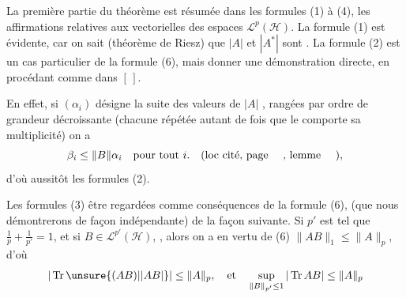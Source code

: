 La première partie du théorème est résumée dans les
formules (1) à (4),   les affirmations relatives
aux  vectorielles des espaces $\mathcal L^p(\mathcal H)$.
La formule (1) est évidente, car 
  on sait (théorème
de Riesz) que $|A|$ et $|A^*|$ sont  
 . La formule (2) est un cas
particulier de la formule (6), mais  
donner une démonstration 
directe, en procédant comme dans $[\,]$.

En effet, si $(\alpha_i)$  désigne la
suite des valeurs  de  $|A|$
 ,
rangées par ordre de grandeur
décroissante (chacune répétée autant de fois
que le comporte sa multiplicité) on a
\[
\beta_i\leq\|B\|\alpha_i\quad\text{pour tout }i.\quad(\text{loc cité, page \quad, lemme \quad}),
\]
d'où aussitôt les formules (2).

Les formules (3)   être regardées  comme
conséquences de la formule (6), (que nous démontrerons de façon indépendante) de la façon
suivante. Si $p'$ est tel que $\frac{1}{p}+\frac{1}{p'}=1$,
et si $B\in\mathcal L^{p'}(\mathcal H)$, 
, alors
on a en vertu de (6) $\|AB\|_1\leq\|A\|_p$, d'où
\[
|\operatorname{Tr}\unsure{(AB)|\lvert AB\rvert}|\leq\|A\|_p,\quad\text{et}\quad
\sup_{\|B\|_{p'}\leq1}|\operatorname{Tr}AB|\leq\|A\|_p
\]
